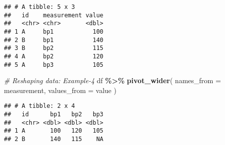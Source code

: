 \documentclass[
]{article}
\newenvironment{Shaded}{\begin{snugshade}}{\end{snugshade}}
\newcommand{\AttributeTok}[1]{\textcolor[rgb]{0.13,0.29,0.53}{#1}}
\newcommand{\CommentTok}[1]{\textcolor[rgb]{0.56,0.35,0.01}{\textit{#1}}}
\newcommand{\FunctionTok}[1]{\textcolor[rgb]{0.13,0.29,0.53}{\textbf{#1}}}
\newcommand{\NormalTok}[1]{#1}
\newcommand{\SpecialCharTok}[1]{\textcolor[rgb]{0.81,0.36,0.00}{\textbf{#1}}}
\begin{document}
\begin{verbatim}
## # A tibble: 5 x 3
##   id    measurement value
##   <chr> <chr>       <dbl>
## 1 A     bp1           100
## 2 B     bp1           140
## 3 B     bp2           115
## 4 A     bp2           120
## 5 A     bp3           105
\end{verbatim}

\begin{Shaded}
\begin{Highlighting}[]
\CommentTok{\# Reshaping data: Example{-}4}
\NormalTok{df }\SpecialCharTok{\%\textgreater{}\%}
  \FunctionTok{pivot\_wider}\NormalTok{(}
    \AttributeTok{names\_from =}\NormalTok{ measurement,}
    \AttributeTok{values\_from =}\NormalTok{ value}
\NormalTok{)}
\end{Highlighting}
\end{Shaded}

\begin{verbatim}
## # A tibble: 2 x 4
##   id      bp1   bp2   bp3
##   <chr> <dbl> <dbl> <dbl>
## 1 A       100   120   105
## 2 B       140   115    NA
\end{verbatim}
\end{document}
